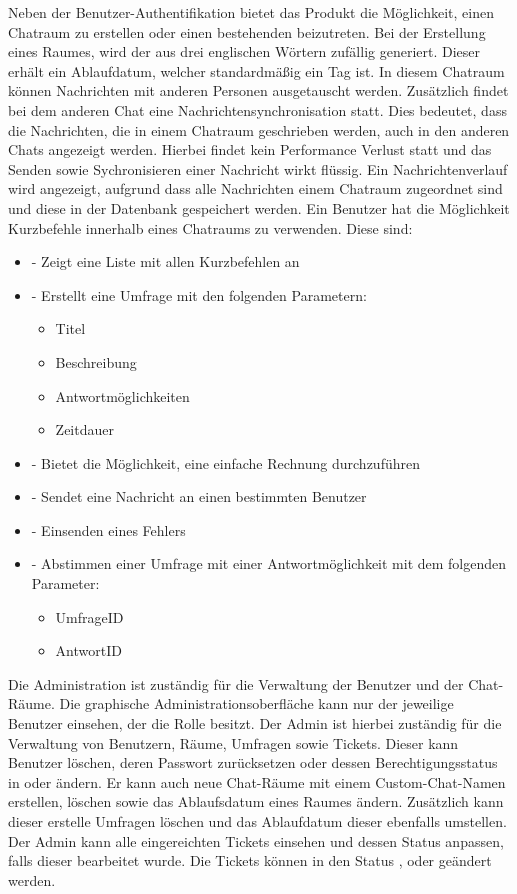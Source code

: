 \noindent
Neben der Benutzer-Authentifikation bietet das Produkt die Möglichkeit, einen Chatraum zu erstellen oder einen bestehenden beizutreten. Bei der Erstellung eines Raumes, wird der  aus drei englischen Wörtern zufällig generiert. Dieser erhält ein Ablaufdatum, welcher standardmäßig ein Tag ist. In diesem Chatraum können Nachrichten mit anderen Personen ausgetauscht werden. Zusätzlich findet bei dem anderen Chat eine Nachrichtensynchronisation statt. Dies bedeutet, dass die Nachrichten, die in einem Chatraum geschrieben werden, auch in den anderen Chats angezeigt werden. Hierbei findet kein Performance Verlust statt und das Senden sowie Sychronisieren einer Nachricht wirkt flüssig. Ein Nachrichtenverlauf wird angezeigt, aufgrund dass alle Nachrichten einem Chatraum zugeordnet sind und diese in der Datenbank gespeichert werden. Ein Benutzer hat die Möglichkeit Kurzbefehle innerhalb eines Chatraums zu verwenden. Diese sind:
\begin{itemize}
  \item {} - Zeigt eine Liste mit allen Kurzbefehlen an
  \item {} - Erstellt eine Umfrage mit den folgenden Parametern:
  \begin{itemize}
    \item Titel
    \item Beschreibung
    \item Antwortmöglichkeiten
    \item Zeitdauer
  \end{itemize}
  \item {} - Bietet die Möglichkeit, eine einfache Rechnung durchzuführen
  \item {} - Sendet eine Nachricht an einen bestimmten Benutzer
  \item {} - Einsenden eines Fehlers
  \item {} - Abstimmen einer Umfrage mit einer Antwortmöglichkeit mit dem folgenden Parameter:
  \begin{itemize}
    \item UmfrageID
    \item AntwortID
  \end{itemize}
\end{itemize}

\noindent
Die Administration ist zuständig für die Verwaltung der Benutzer und der Chat-Räume. Die graphische Administrationsoberfläche kann nur der jeweilige Benutzer einsehen, der die Rolle  besitzt. Der Admin ist hierbei zuständig für die Verwaltung von Benutzern, Räume, Umfragen sowie Tickets. Dieser kann Benutzer löschen, deren Passwort zurücksetzen oder dessen Berechtigungsstatus in  oder  ändern. Er kann auch neue Chat-Räume mit einem Custom-Chat-Namen erstellen, löschen sowie das Ablaufsdatum eines Raumes ändern. Zusätzlich kann dieser erstelle Umfragen löschen und das Ablaufdatum dieser ebenfalls umstellen. Der Admin kann alle eingereichten Tickets einsehen und dessen Status anpassen, falls dieser bearbeitet wurde. Die Tickets können in den Status , oder  geändert werden.

